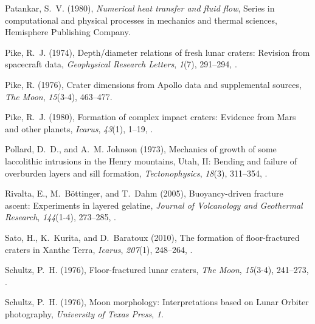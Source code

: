 \begin{article}
\begin{enumerate}
\begin{thebibliography}{39}
Patankar, S.~V. (1980), \textit{{Numerical heat transfer and fluid flow}},
  Series in computational and physical processes in mechanics and thermal
  sciences, Hemisphere Publishing Company.

Pike, R.~J. (1974), {Depth/diameter relations of fresh lunar craters: Revision
  from spacecraft data}, \textit{Geophysical Research Letters}, \textit{1}(7),
  291--294, .
  
Pike, R. (1976), {Crater dimensions from Apollo data and supplemental sources},
  \textit{The Moon}, \textit{15}(3-4), 463--477.

Pike, R.~J. (1980), {Formation of complex impact craters:
  Evidence from Mars and other planets}, \textit{Icarus}, \textit{43}(1),
  1--19, .

Pollard, D.~D., and A.~M. Johnson (1973), {Mechanics of growth of some
  laccolithic intrusions in the Henry mountains, Utah, II: Bending and failure
  of overburden layers and sill formation}, \textit{Tectonophysics},
  \textit{18}(3), 311--354, .

Rivalta, E., M.~B\"{o}ttinger, and T.~Dahm (2005), {Buoyancy-driven fracture
  ascent: Experiments in layered gelatine}, \textit{Journal of Volcanology and
  Geothermal Research}, \textit{144}(1-4), 273--285,
  .

Sato, H., K.~Kurita, and D.~Baratoux (2010), {The formation of floor-fractured
  craters in Xanthe Terra}, \textit{Icarus}, \textit{207}(1), 248--264,
  .

Schultz, P.~H. (1976{}), {Floor-fractured lunar craters},
  \textit{The Moon}, \textit{15}(3-4), 241--273, .

Schultz, P.~H. (1976{}), {Moon morphology: Interpretations based on
  Lunar Orbiter photography}, \textit{University of Texas Press}, \textit{1}.


\end{thebibliography}
\end{enumerate}
\end{article}
